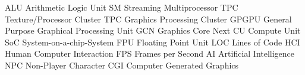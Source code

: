 \usepackage[acronyms, nonumberlist, shortcuts]{glossaries}
\makeglossaries


 {ALU} {Arithmetic Logic Unit}
 {SM} {Streaming Multiprocessor}
 {TPC} {Texture/Processor Cluster}
 {TPC} {Graphics Processing Cluster}
 {GPGPU} {General Purpose Graphical Processing Unit}
 {GCN} {Graphics Core Next}
 {CU} {Compute Unit}
 {SoC} {System-on-a-chip-System}
 {FPU} {Floating Point Unit}
 {LOC} {Lines of Code}
 {HCI} {Human Computer Interaction}
 {FPS} {Frames per Second}
 {AI} {Artificial Intelligence}
 {NPC} {Non-Player Character}
 {CGI} {Computer Generated Graphics}

